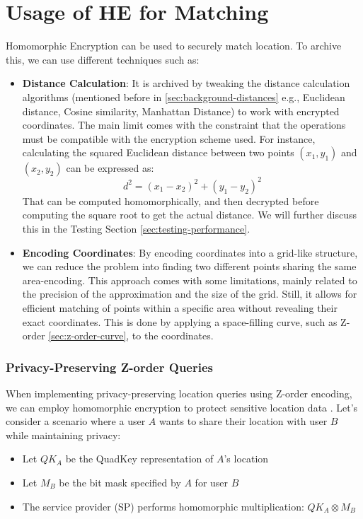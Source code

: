 \section{Usage of HE for Matching}
Homomorphic Encryption can be used to securely match location. To archive this, we can use different techniques such as:
\begin{itemize}
    \item \textbf{Distance Calculation}: It is archived by tweaking the distance calculation algorithms (mentioned before in \cref{sec:background-distances} e.g., Euclidean distance, Cosine similarity, Manhattan Distance) to work with encrypted coordinates. The main limit comes with the constraint that the operations must be compatible with the encryption scheme used. For instance, calculating the squared Euclidean distance between two points \( (x_1, y_1) \) and \( (x_2, y_2) \) can be expressed as:
    \[
        d^2 = (x_1 - x_2)^2 + (y_1 - y_2)^2
    \]
    That can be computed homomorphically, and then decrypted before computing the square root to get the actual distance. We will further discuss this in the Testing Section \ref{sec:testing-performance}.
    \item \textbf{Encoding Coordinates}: By encoding coordinates into a grid-like structure, we can reduce the problem into finding two different points sharing the same area-encoding. This approach comes with some limitations, mainly related to the precision of the approximation and the size of the grid. Still, it allows for efficient matching of points within a specific area without revealing their exact coordinates. This is done by applying a space-filling curve, such as Z-order \cref{sec:z-order-curve}, to the coordinates.
\end{itemize}

\subsubsection{Privacy-Preserving Z-order Queries}
When implementing privacy-preserving location queries using Z-order encoding, we can employ homomorphic encryption to protect sensitive location data \cite{zhang2020privacy}. Let's consider a scenario where a user \( A \) wants to share their location with user \( B \) while maintaining privacy:

\begin{itemize}
    \item Let \( QK_A \) be the QuadKey representation of \( A \)'s location
    \item Let \( M_B \) be the bit mask specified by \( A \) for user \( B \)
    \item The service provider (SP) performs homomorphic multiplication: \( QK_A \otimes M_B \)
\end{itemize}

